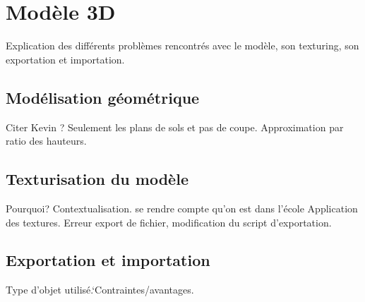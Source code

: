 \section{Modèle 3D}
Explication des différents problèmes rencontrés avec le modèle, son texturing, son exportation et importation.

\subsection{Modélisation géométrique}
Citer Kevin ?
Seulement les plans de sols et pas de coupe. Approximation par ratio des hauteurs.

\subsection{Texturisation du modèle}
Pourquoi? Contextualisation. se rendre compte qu'on est dans l'école
Application des textures.
Erreur export de fichier, modification du script d'exportation.

\subsection{Exportation et importation}
Type d'objet utilisé.`Contraintes/avantages.